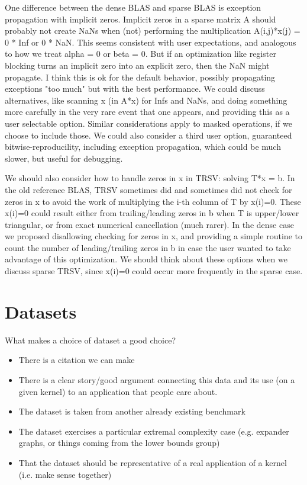 \documentclass{article}
\begin{document}
One difference between the dense BLAS and sparse BLAS
is exception propagation with implicit zeros.
Implicit zeros in a sparse matrix A should probably not create NaNs when (not) performing
the multiplication A(i,j)*x(j) = 0 * Inf or 0 * NaN. This seems consistent with user expectations,
and analogous to how we treat alpha = 0 or beta = 0. But if an optimization like register blocking
turns an implicit zero into an explicit zero, then the NaN might propagate. I think this is ok for
the default behavior, possibly propagating exceptions "too much" but with the best performance.
We could discuss alternatives, like scanning x (in A*x) for Infs and NaNs, and doing something
more carefully in the very rare event that one appears, and providing this as a user selectable option.
Similar considerations apply to masked operations, if we choose to include those. We could also consider a third
user option, guaranteed bitwise-reproducility, including
exception propagation, which could be much slower, but
useful for debugging.

We should also consider how to handle zeros in x in TRSV: solving T*x = b. In the old reference BLAS, TRSV sometimes did and
sometimes did not check for zeros in x to avoid the work of multiplying the i-th column of T by x(i)=0.
These x(i)=0 could result either from trailing/leading zeros in b when T is upper/lower triangular,
or from exact numerical cancellation (much rarer). In the dense case we proposed disallowing
checking for zeros in x, and providing a simple routine to count the number of leading/trailing
zeros in b in case the user wanted to take advantage of this optimization. We should think about
these options when we discuss sparse TRSV, since x(i)=0 could occur more frequently in the sparse case. 

\section{Datasets}

What makes a choice of dataset a good choice?
\begin{itemize}
    \item There is a citation we can make
    \item There is a clear story/good argument connecting this data and its use (on a given kernel) to an application that people care about.
    \item The dataset is taken from another already existing benchmark
    \item The dataset exercises a particular extremal complexity case (e.g. expander graphs, or things coming from the lower bounds group)
    \item That the dataset should be representative of a real application of a  kernel (i.e. make sense together)
\end{itemize}
\end{document}
